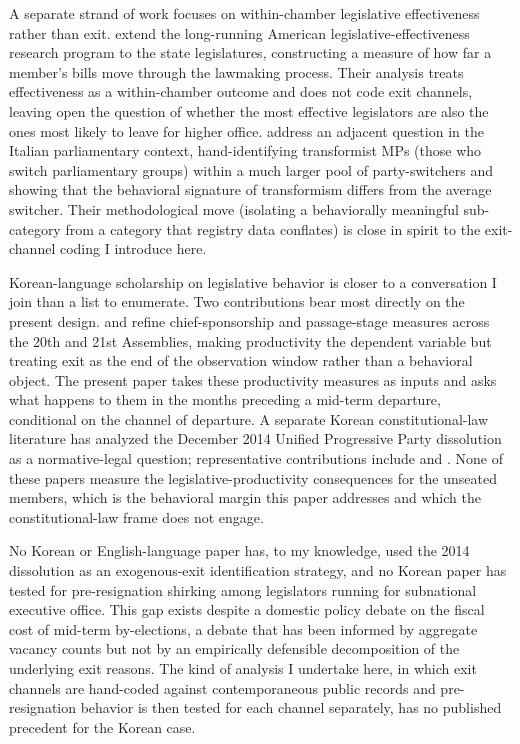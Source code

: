 \documentclass[11pt]{article}
\begin{document}
A separate strand of work focuses on within-chamber legislative effectiveness rather than exit. \citet{volden2024} extend the long-running American legislative-effectiveness research program to the state legislatures, constructing a measure of how far a member's bills move through the lawmaking process. Their analysis treats effectiveness as a within-chamber outcome and does not code exit channels, leaving open the question of whether the most effective legislators are also the ones most likely to leave for higher office. \citet{giommoni2022} address an adjacent question in the Italian parliamentary context, hand-identifying transformist MPs (those who switch parliamentary groups) within a much larger pool of party-switchers and showing that the behavioral signature of transformism differs from the average switcher. Their methodological move (isolating a behaviorally meaningful sub-category from a category that registry data conflates) is close in spirit to the exit-channel coding I introduce here.

Korean-language scholarship on legislative behavior is closer to a conversation I join than a list to enumerate. Two contributions bear most directly on the present design. \citet{an2025} and \citet{ka2025} refine chief-sponsorship and passage-stage measures across the 20th and 21st Assemblies, making productivity the dependent variable but treating exit as the end of the observation window rather than a behavioral object. The present paper takes these productivity measures as inputs and asks what happens to them in the months preceding a mid-term departure, conditional on the channel of departure. A separate Korean constitutional-law literature has analyzed the December 2014 Unified Progressive Party dissolution as a normative-legal question; representative contributions include \citet{park2014} and \citet{lee2014}. None of these papers measure the legislative-productivity consequences for the unseated members, which is the behavioral margin this paper addresses and which the constitutional-law frame does not engage.

No Korean or English-language paper has, to my knowledge, used the 2014 dissolution as an exogenous-exit identification strategy, and no Korean paper has tested for pre-resignation shirking among legislators running for subnational executive office. This gap exists despite a domestic policy debate on the fiscal cost of mid-term by-elections, a debate that has been informed by aggregate vacancy counts but not by an empirically defensible decomposition of the underlying exit reasons. The kind of analysis I undertake here, in which exit channels are hand-coded against contemporaneous public records and pre-resignation behavior is then tested for each channel separately, has no published precedent for the Korean case.
\end{document}
